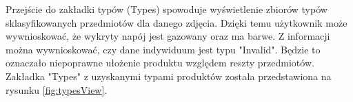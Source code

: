 {\begin{figure}[h]
\end{figure}

Przejście do zakładki typów (Types) spowoduje wyświetlenie zbiorów typów sklasyfikowanych przedmiotów dla danego zdjęcia. Dzięki temu użytkownik może wywnioskować, że wykryty napój jest gazowany oraz ma barwe. Z informacji można wywnioskować, czy dane indywiduum jest typu "Invalid". Będzie to oznaczało niepoprawne ułożenie produktu względem reszty przedmiotów. Zakładka "Types" z uzyskanymi typami produktów została przedstawiona na rysunku \ref{fig:typesView}.

\begin{figure}[h]
	\centering
	\quad

\end{figure}}
